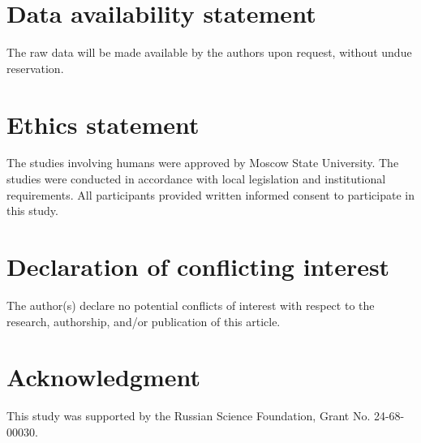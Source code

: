 \documentclass[journal,twoside,web]{ieeecolor2}
\begin{document}
\section*{Data availability statement}

The raw data will be made available by the authors upon request, without undue reservation.

\section*{Ethics statement}

The studies involving humans were approved by Moscow State University. The studies were conducted in accordance with local legislation and institutional requirements. All participants provided written informed consent to participate in this study.

\section*{Declaration of conflicting interest}

The author(s) declare no potential conflicts of interest with respect to the research, authorship, and/or publication of this article.

\section*{Acknowledgment}

This study was supported by the Russian Science Foundation, Grant No. 24-68-00030.

{}

\end{document}
